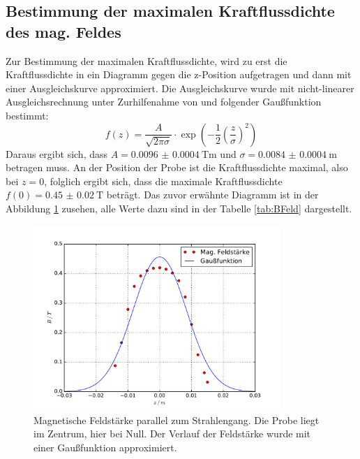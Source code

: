 \subsection{Bestimmung der maximalen Kraftflussdichte des mag. Feldes}
\label{sec:BFeld}
Zur Bestimmung der maximalen Kraftflussdichte, wird zu erst die Kraftflussdichte in ein
Diagramm gegen die z-Position aufgetragen und dann mit einer Ausgleichskurve approximiert.
Die Ausgleichskurve wurde mit nicht-linearer Ausgleichsrechnung unter Zurhilfenahme von
\cite{scipy} und folgender Gaußfunktion bestimmt:
\begin{equation*}
	f(z)= \frac{A}{\sqrt{2\pi\sigma}}\cdot\exp\left(-\frac{1}{2} \left(\frac{z}{\sigma} \right) ^2 \right)
\end{equation*}
Daraus ergibt sich, dass $A= \SI{0.0096(4)}{\tesla\meter}$ und $\sigma = \SI{0.0084(4)}{\meter}$
betragen muss. An der Position der Probe ist die Kraftflussdichte maximal, also bei
$z =0$, folglich ergibt sich, dass  die maximale Kraftflussdichte $f(0) = \SI{0.45(2)}{\tesla}$
beträgt. Das zuvor erwähnte Diagramm ist in der Abbildung \ref{fig:BFeld} zusehen, alle Werte
dazu sind in der Tabelle \ref{tab:BFeld} dargestellt.
 \begin{figure}
   \centering
   \includegraphics[height= 7cm]{plots/BFeld.pdf}
   \caption{Magnetische Feldstärke parallel zum Strahlengang. Die Probe liegt im Zentrum, hier bei Null. Der Verlauf der Feldstärke wurde mit einer Gaußfunktion approximiert.}
   \label{fig:BFeld}
 \end{figure}

